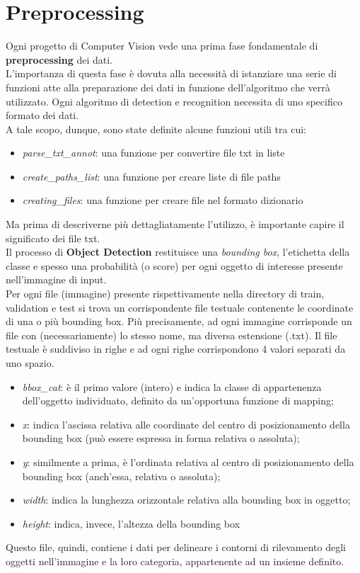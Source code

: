 \documentclass{report}
\begin{document}
\section{Preprocessing}
Ogni progetto di Computer Vision vede una prima fase fondamentale di \textbf{preprocessing} dei dati. \\
L'importanza di questa fase è dovuta alla necessità di istanziare una serie di funzioni atte alla preparazione dei dati in funzione dell'algoritmo che verrà utilizzato. Ogni algoritmo di detection e recognition necessita di uno specifico formato dei dati.\\
A tale scopo, dunque, sono state definite alcune funzioni utili tra cui:
\begin{itemize}
\item {\itshape parse\_txt\_annot}: una funzione per convertire file txt in liste
\item {\itshape create\_paths\_list}: una funzione per creare liste di file paths
\item {\itshape creating\_files}: una funzione per creare file nel formato dizionario
\end{itemize}
Ma prima di descriverne più dettagliatamente l'utilizzo, è importante capire il significato dei file txt.\\


Il processo di \textbf{Object Detection} restituisce una {\itshape bounding box}, l'etichetta della classe e spesso una probabilità (o score) per ogni oggetto di interesse presente nell'immagine di input. \\
Per ogni file (immagine) presente rispettivamente nella directory di train, validation e test si trova un corrispondente file testuale contenente le coordinate di una o più bounding box. Più precisamente, ad ogni immagine corrisponde un file con (necessariamente) lo stesso nome, ma diversa estensione (.txt). Il file testuale è suddiviso in righe e ad ogni righe corrispondono 4 valori separati da uno spazio.\\
\begin{itemize}
\item {\itshape bbox\_cat}: è il primo valore (intero) e indica la classe di appartenenza dell'oggetto individuato, definito da un'opportuna funzione di mapping;
\item {\itshape x}: indica l'ascissa relativa alle coordinate del centro di posizionamento della bounding box (può essere espressa in forma relativa o assoluta);
\item {\itshape y}: similmente a prima, è l'ordinata relativa al centro di posizionamento della bounding box (anch'essa, relativa o assoluta);
\item {\itshape width}: indica la lunghezza orizzontale relativa alla bounding box in oggetto;
\item {\itshape height}: indica, invece, l'altezza della bounding box
\end{itemize}
Questo file, quindi, contiene i dati per delineare i contorni di rilevamento degli oggetti nell'immagine e la loro categoria, appartenente ad un insieme definito.\\
\end{document}

